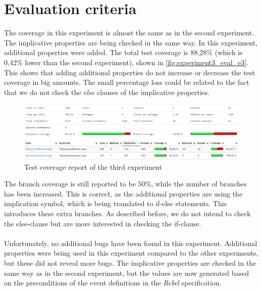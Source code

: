 \section{Evaluation criteria}
The coverage in this experiment is almost the same as in the second experiment.
The implicative properties are being checked in the same way. In this
experiment, additional properties were added. The total test coverage is 88,28\%
(which is 0,42\% lower than the second experiment), shown in
\autoref{fig:experiment3_eval_e3}. This shows that adding additional properties
do not increase or decrease the test coverage in big amounts. The small
percentage loss could be related to the fact that we do not check the
\textit{else} clauses of the implicative properties.
\begin{figure}[!ht]
	\includegraphics[width=\linewidth]{figures/eval_e3}
\caption{Test coverage report of the third experiment}
\label{fig:experiment3_eval_e3}
\centering
\end{figure}
\FloatBarrier\noindent
The branch coverage is still reported to be 50\%, while the number of branches
has been increased. This is correct, as the additional properties are using the
implication symbol, which is being translated to if-else statements. This
introduces these extra branches. As described before, we do not intend to check
the else-clause but are more interested in checking the if-clause.\\
\\
Unfortunately, no additional bugs have been found in this experiment. Additional
properties were being used in this experiment compared to the other experiments,
but these did not reveal more bugs. The implicative properties are checked
in the same way as in the second experiment, but the values are now generated
based on the preconditions of the event definitions in the \textit{Rebel}
specification.\\
\\
